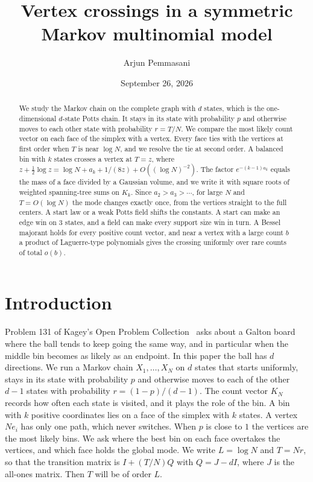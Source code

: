 \documentclass[11pt]{article}
\title{Vertex crossings in a symmetric
 Markov multinomial model}
\author{Arjun Pemmasani}
\date{September 26, 2026}
\theoremstyle{definition}
\theoremstyle{remark}
\begin{document}
\maketitle

\begin{abstract}
We study the Markov chain on the complete graph with $d$ states, which is the
one-dimensional $d$-state Potts chain. It stays in its state with probability
$p$ and otherwise moves to each other state with probability $r=T/N$. We
compare the most likely count vector on each face of the simplex with a vertex.
Every face ties with the vertices at first order when $T$ is near $\log N$, and
we resolve the tie at second order. A balanced bin with $k$ states crosses a
vertex at $T=z$, where $z+\frac12\log z=\log N+a_k+1/(8z)+O((\log N)^{-2})$.
The factor $e^{-(k-1)a_k}$ equals the mass of a face divided by a Gaussian
volume, and we write it with square roots of weighted spanning-tree sums on
$K_k$.
Since $a_2>a_3>\cdots$, for large $N$ and $T=O(\log N)$ the mode changes
exactly once, from the vertices straight to the full centers. A start law or a
weak Potts field shifts the constants. A start can make an edge win on 3
states, and a field can make every support size win in turn. A Bessel majorant
holds for every positive count vector, and near a vertex with a large count $b$
a product of Laguerre-type polynomials gives the crossing uniformly over rare
counts of total $o(b)$.
\end{abstract}

\section{Introduction}\label{sec:intro}

Problem 131 of Kagey's Open Problem Collection~\cite{kagey131} asks about a
Galton board where the ball tends to keep going the same way, and in
particular when the middle bin becomes as likely as an endpoint. In this paper
the ball has $d$ directions. We run a Markov chain $X_1,\ldots,X_N$ on $d$
states that starts uniformly, stays in its state with probability $p$ and
otherwise moves to each of the other $d-1$ states with probability
$r=(1-p)/(d-1)$. The count vector $K_N$ records how often each state is
visited, and it plays the role of the bin. A bin with $k$ positive coordinates
lies on a face of the simplex with $k$ states. A vertex $Ne_i$ has only one
path, which never switches. When $p$ is close to $1$ the vertices are the most
likely bins. We ask where the best bin on each face overtakes the vertices, and
which face holds the global mode. We write $L=\log N$ and $T=Nr$, so that the
transition matrix is $I+(T/N)Q$ with $Q=J-dI$, where $J$ is the all-ones
matrix. Then $T$ will be of order $L$.
\end{document}
